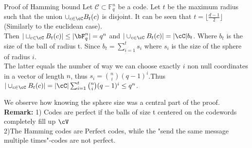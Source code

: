 \begin{frame}{Proof of Hamming bound}
Let \(\mathcal{C} \subset \mathbb{F}_q^n\) be a code. \pause Let \(t\) be the maximum radius such that the union \(\cup_{c \in \cC}B_t(c)\) is disjoint. \pause  It can be seen that \(t = \lfloor \frac{d-1}{2}\rfloor\) (Similarly to the euclidean case). \\
\pause Then \(|\sqcup_{c \in \cC}B_t(c)|\leq |\bF_q^n|=q^n\) and \pause \(|\cup_{c \in \cC}B_t(c)| = |\cC|b_t\). Where \(b_t\) is the size of the ball of radius t. \pause Since \(b_t = \sum_{i=1}^ts_i\) where \(s_i\) is the size of the sphere of radius \(i\). \\ \pause The latter equals the number of way we can choose exactly \(i\) non null coordinates in a vector of length \(n\), thus \(s_i = \binom{n}{i}(q-1)^i\).\pause Thus \(|\cup_{c \in \cC}B_t(c)| = |\cC|\sum_{i=1}^t \binom{n}{i}(q-1)^i \leq q^n \). 


\vspace{1cm}
We observe how knowing the sphere size was a central part of the proof. \\ \pause
\vspace{1cm}
\textbf{Remark:} 1) Codes are perfect if the balls of size t centered on the codewords completely fill up \(\cV\) \\2)The Hamming codes are Perfect codes, while the "send the same message multiple times"-codes are not perfect.

\end{frame}

